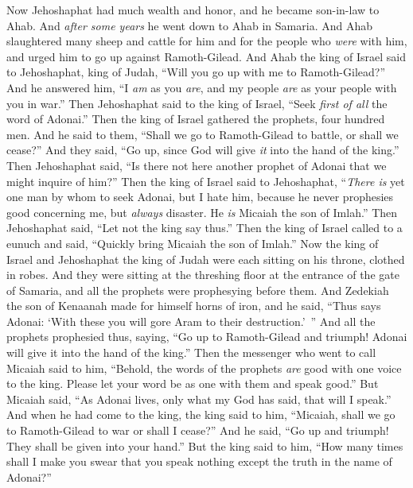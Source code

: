 \begin{biblechapter} %
 Now Jehoshaphat had much wealth and honor, and he became son-in-law to Ahab.
\verse And \textit{after some years} he went down to Ahab in Samaria. And Ahab slaughtered many sheep and cattle for him and for the people who \textit{were} with him, and urged him to go up against Ramoth-Gilead.
\verse And Ahab the king of Israel said to Jehoshaphat, king of Judah, “Will you go up with me to Ramoth-Gilead?” And he answered him, “I \textit{am} as you \textit{are}, and my people \textit{are} as your people with you in war.”
\verse Then Jehoshaphat said to the king of Israel, “Seek \textit{first of all} the word of Adonai.”
\verse Then the king of Israel gathered the prophets, four hundred men. And he said to them, “Shall we go to Ramoth-Gilead to battle, or shall we cease?” And they said, “Go up, since God will give \textit{it} into the hand of the king.”
\verse Then Jehoshaphat said, “Is there not here another prophet of Adonai that we might inquire of him?”
\verse Then the king of Israel said to Jehoshaphat, “\textit{There is} yet one man by whom to seek Adonai, but I hate him, because he never prophesies good concerning me, but \textit{always} disaster. He \textit{is} Micaiah the son of Imlah.” Then Jehoshaphat said, “Let not the king say thus.”
\verse Then the king of Israel called to a eunuch and said, “Quickly bring Micaiah the son of Imlah.”
\verse Now the king of Israel and Jehoshaphat the king of Judah were each sitting on his throne, clothed in robes. And they were sitting at the threshing floor at the entrance of the gate of Samaria, and all the prophets were prophesying before them.
\verse And Zedekiah the son of Kenaanah made for himself horns of iron, and he said, “Thus says Adonai: ‘With these you will gore Aram to their destruction.’ ”
\verse And all the prophets prophesied thus, saying, “Go up to Ramoth-Gilead and triumph! Adonai will give it into the hand of the king.”
\verse Then the messenger who went to call Micaiah said to him, “Behold, the words of the prophets \textit{are} good with one voice to the king. Please let your word be as one with them and speak good.”
\verse But Micaiah said, “As Adonai lives, only what my God has said, that will I speak.”
\verse And when he had come to the king, the king said to him, “Micaiah, shall we go to Ramoth-Gilead to war or shall I cease?” And he said, “Go up and triumph! They shall be given into your hand.”
\verse But the king said to him, “How many times shall I make you swear that you speak nothing except the truth in the name of Adonai?”

\end{biblechapter}
